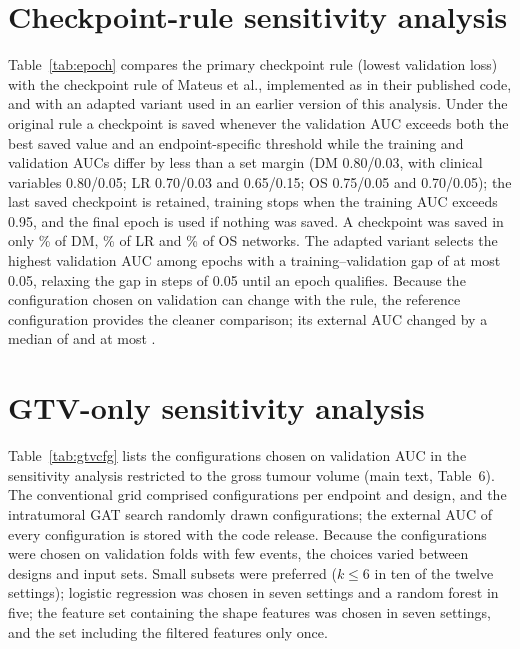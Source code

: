 \documentclass[11pt]{article}
\begin{document}
\section{Checkpoint-rule sensitivity analysis}\label{sec:epoch}

Table~\ref{tab:epoch} compares the primary checkpoint rule (lowest validation loss) with the checkpoint rule of Mateus et al., implemented as in their published code, and with an adapted variant used in an earlier version of this analysis. Under the original rule a checkpoint is saved whenever the validation AUC exceeds both the best saved value and an endpoint-specific threshold while the training and validation AUCs differ by less than a set margin (DM 0.80/0.03, with clinical variables 0.80/0.05; LR 0.70/0.03 and 0.65/0.15; OS 0.75/0.05 and 0.70/0.05); the last saved checkpoint is retained, training stops when the training AUC exceeds 0.95, and the final epoch is used if nothing was saved. A checkpoint was saved in only \msSavedDM\% of DM, \msSavedLR\% of LR and \msSavedOS\% of OS networks. The adapted variant selects the highest validation AUC among epochs with a training--validation gap of at most 0.05, relaxing the gap in steps of 0.05 until an epoch qualifies. Because the configuration chosen on validation can change with the rule, the reference configuration provides the cleaner comparison; its external AUC changed by a median of  and at most .

\begin{table}[!htb]
\centering
\caption{External AUC [95\% CI] of the chosen and reference GATs under the three checkpoint rules.}\label{tab:epoch}
\resizebox{\textwidth}{!}{}
\end{table}

\section{GTV-only sensitivity analysis}

Table~\ref{tab:gtvcfg} lists the configurations chosen on validation AUC in the sensitivity analysis restricted to the gross tumour volume (main text, Table~6). The conventional grid comprised \gtvNcls{} configurations per endpoint and design, and the intratumoral GAT search \gtvNgat{} randomly drawn configurations; the external AUC of every configuration is stored with the code release. Because the configurations were chosen on validation folds with few events, the choices varied between designs and input sets. Small subsets were preferred ($k\leq6$ in ten of the twelve settings); logistic regression was chosen in seven settings and a random forest in five; the feature set containing the shape features was chosen in seven settings, and the set including the filtered features only once.
\end{document}
